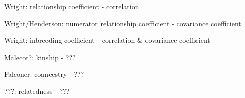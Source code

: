 


Wright: relationship coefficient - correlation

Wright/Henderson: numerator relationship coefficient - covariance coefficient

Wright: inbreeding coefficient - correlation \& covariance coefficient

Malecot?: kinship - ???

Falconer: coancestry - ???

???: relatedness - ???

% 
%



